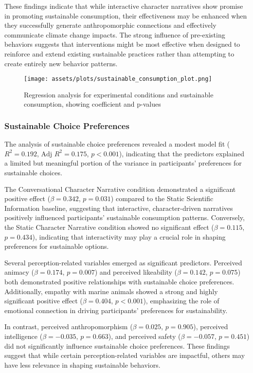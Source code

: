 \documentclass[sigconf, nonacm]{acmart}
\begin{document}
These findings indicate that while interactive character narratives show promise in promoting sustainable consumption, their effectiveness may be enhanced when they successfully generate anthropomorphic connections and effectively communicate climate change impacts. The strong influence of pre-existing behaviors suggests that interventions might be most effective when designed to reinforce and extend existing sustainable practices rather than attempting to create entirely new behavior patterns.
\begin{figure}
    \centering
    \texttt{[image: assets/plots/sustainable\_consumption\_plot.png]}
    \caption{Regression analysis for experimental conditions and sustainable consumption, showing coefficient and p-values}
    \label{fig:consumption_post}
\end{figure}

\subsubsection{Sustainable Choice Preferences}
The analysis of sustainable choice preferences revealed a modest model fit ($R^2 = 0.192$, $\text{Adj } R^2 = 0.175$, $p < 0.001$), indicating that the predictors explained a limited but meaningful portion of the variance in participants' preferences for sustainable choices.

The Conversational Character Narrative condition demonstrated a significant positive effect ($\beta = 0.342$, $p = 0.031$) compared to the Static Scientific Information baseline, suggesting that interactive, character-driven narratives positively influenced participants' sustainable consumption patterns. Conversely, the Static Character Narrative condition showed no significant effect ($\beta = 0.115$, $p = 0.434$), indicating that interactivity may play a crucial role in shaping preferences for sustainable options.

Several perception-related variables emerged as significant predictors. Perceived animacy ($\beta = 0.174$, $p = 0.007$) and perceived likeability ($\beta = 0.142$, $p = 0.075$) both demonstrated positive relationships with sustainable choice preferences. Additionally, empathy with marine animals showed a strong and highly significant positive effect ($\beta = 0.404$, $p < 0.001$), emphasizing the role of emotional connection in driving participants’ preferences for sustainability.

In contrast, perceived anthropomorphism ($\beta = 0.025$, $p = 0.905$), perceived intelligence ($\beta = -0.035$, $p = 0.663$), and perceived safety ($\beta = -0.057$, $p = 0.451$) did not significantly influence sustainable choice preferences. These findings suggest that while certain perception-related variables are impactful, others may have less relevance in shaping sustainable behaviors.
\end{document}
